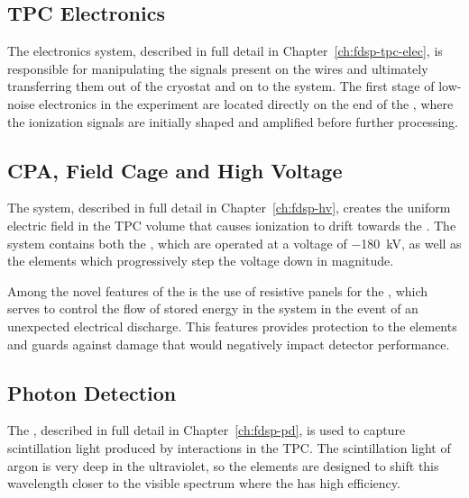 \subsection{TPC Electronics}
\label{sec:fdsp-ov-elec}

The electronics system, described in full detail in Chapter~\ref{ch:fdsp-tpc-elec}, is responsible for manipulating the signals present on the  wires and ultimately transferring them out of the cryostat and on to the  system.  The first stage of low-noise electronics in the experiment are located directly on the end of the , where the ionization signals are initially shaped and amplified before further processing. 



\subsection{CPA, Field Cage and High Voltage}
\label{sec:fdsp-ov-hv}

The  system, described in full detail in Chapter~\ref{ch:fdsp-hv}, creates the uniform electric field in the TPC volume that causes ionization to drift towards the .  The  system contains both the , which are operated at a 
voltage of \SI{-180}{kV}, as well as the  elements which progressively step the  voltage down in magnitude.  

Among the novel features of the \single \lartpc is the use of resistive panels for the , which serves to control the flow of stored energy in the  system in the event of an unexpected electrical discharge.  This features provides protection to the  elements and guards against damage that would negatively impact detector performance.  


\subsection{Photon Detection}
\label{sec:fdsp-ov-pds}

The , described in full detail in Chapter~\ref{ch:fdsp-pd}, is used to capture scintillation light produced by interactions in the TPC.  The scintillation light of argon is very deep in the ultraviolet, so the  elements are designed to shift this wavelength closer to the visible spectrum where the  has high efficiency.  


